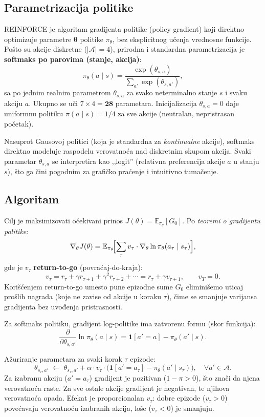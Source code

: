 \documentclass[12pt,a4paper]{article}
\begin{document}
\subsection{Parametrizacija politike}

REINFORCE je algoritam gradijenta politike (policy gradient) koji direktno
optimizuje parametre $\boldsymbol\theta$ politike $\pi_\theta$, bez eksplicitnog
učenja vrednosne funkcije.
Pošto su akcije diskretne ($|\mathcal{A}| = 4$), prirodna i standardna parametrizacija
je \textbf{softmaks po parovima (stanje, akcija)}:
\[
\pi_\theta(a \mid s) = \frac{\exp(\theta_{s,a})}{\displaystyle\sum_{a'}
  \exp(\theta_{s,a'})},
\]
sa po jednim realnim parametrom $\theta_{s,a}$ za svako neterminalno stanje $s$
i svaku akciju $a$.
Ukupno se uči $7 \times 4 = \mathbf{28}$ parametara.
Inicijalizacija $\theta_{s,a} = 0$ daje uniformnu politiku
$\pi(a \mid s) = 1/4$ za sve akcije (neutralan, nepristrasan početak).

Nasuprot Gausovoj politici (koja je standardna za \emph{kontinualne} akcije),
softmaks direktno modeluje raspodelu verovatnoća nad diskretnim skupom akcija.
Svaki parametar $\theta_{s,a}$ se interpretira kao ,,logit'' (relativna preferencija
akcije $a$ u stanju $s$), što ga čini pogodnim za grafičko praćenje i intuitivno tumačenje.

\subsection{Algoritam}

Cilj je maksimizovati očekivani prinos $J(\theta) = \mathbb{E}_{\pi_\theta}[G_0]$.
Po \emph{teoremi o gradijentu politike}:
\[
\nabla_\theta J(\theta) = \mathbb{E}_{\pi_\theta}\!\Bigl[
  \sum_\tau v_\tau \cdot \nabla_\theta \ln \pi_\theta(a_\tau \mid s_\tau)
\Bigr],
\]
gde je $v_\tau$ \textbf{return-to-go} (povraćaj-do-kraja):
\[
v_\tau = r_\tau + \gamma r_{\tau+1} + \gamma^2 r_{\tau+2} + \cdots
       = r_\tau + \gamma v_{\tau+1}, \qquad v_T = 0.
\]
Korišćenjem return-to-go umesto pune epizodne sume $G_0$ eliminišemo uticaj
prošlih nagrada (koje ne zavise od akcije u koraku $\tau$), čime se smanjuje
varijansa gradijenta bez uvođenja pristrasnosti.

Za softmaks politiku, gradijent log-politike ima zatvorenu formu (skor funkcija):
\[
\frac{\partial}{\partial \theta_{s,a'}} \ln \pi_\theta(a \mid s)
= \mathbf{1}[a' = a] - \pi_\theta(a' \mid s).
\]

Ažuriranje parametara za svaki korak $\tau$ epizode:
\[
\theta_{s_\tau, a'} \;\leftarrow\; \theta_{s_\tau, a'}
  + \alpha \cdot v_\tau \cdot \bigl(\mathbf{1}[a' = a_\tau]
    - \pi_\theta(a' \mid s_\tau)\bigr), \quad \forall a' \in \mathcal{A}.
\]
Za izabranu akciju ($a' = a_\tau$) gradijent je pozitivan ($1 - \pi > 0$),
što znači da njena verovatnoća raste.
Za sve ostale akcije gradijent je negativan, te njihova verovatnoća opada.
Efekat je proporcionalan $v_\tau$: dobre epizode ($v_\tau > 0$) povećavaju
verovatnoću izabranih akcija, loše ($v_\tau < 0$) je smanjuju.
\end{document}
